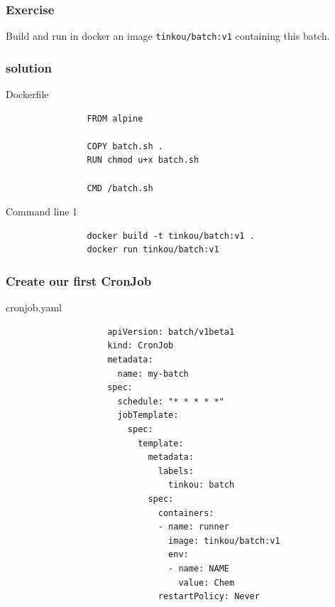 	\begin{frame}[fragile]
		\frametitle{Exercise}
		
		Build and run in docker an image \verb|tinkou/batch:v1| containing this batch.
	\end{frame}

	\begin{frame}[fragile]
		\frametitle{solution}
		
		\begin{block}{Dockerfile}
			\begin{verbatim}
				FROM alpine
				
				COPY batch.sh .
				RUN chmod u+x batch.sh
				
				CMD /batch.sh
			\end{verbatim}
		\end{block}
		
		\begin{block}{Command line 1}
			\begin{verbatim}
				docker build -t tinkou/batch:v1 .
				docker run tinkou/batch:v1
			\end{verbatim}
		\end{block}
	\end{frame}
				
	\begin{frame}[fragile]
		\frametitle{Create our first CronJob}
		
		\begin{block}{cronjob.yaml}
			\begin{tiny}
				\begin{verbatim}
					apiVersion: batch/v1beta1
					kind: CronJob
					metadata:
					  name: my-batch
					spec:
					  schedule: "* * * * *"
					  jobTemplate:
					    spec:
					      template:
					        metadata:
					          labels:
					            tinkou: batch
					        spec:
					          containers:
					          - name: runner
					            image: tinkou/batch:v1
					            env:
					            - name: NAME
					              value: Chem
					          restartPolicy: Never
				\end{verbatim}
			\end{tiny}
		\end{block}
	\end{frame}
	
